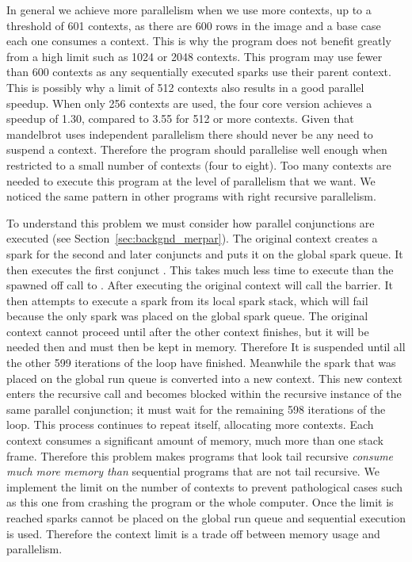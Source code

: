 In general we achieve more parallelism when we use more contexts,
up to a threshold of 601 contexts,
as there are 600 rows in the image and a base case each one consumes a
context.
This is why the program does not benefit greatly from a high limit such as
1024 or 2048 contexts.
This program may use fewer than 600 contexts as any sequentially executed
sparks use their parent context.
This is possibly why a limit of 512 contexts also results in a good parallel
speedup.
When only 256 contexts are used,
the four core version achieves a speedup of 1.30,
compared to 3.55 for 512 or more contexts.
Given that mandelbrot uses independent parallelism there should never be any
need to suspend a context.
Therefore the program should parallelise well enough when restricted to
a small number of contexts (four to eight).
Too many contexts are needed to execute this program at the level of
parallelism that we want.
We noticed the same pattern in other programs with right recursive
parallelism.

\label{context_limit}
To understand this problem we must consider how parallel conjunctions are
executed (see Section~\ref{sec:backgnd_merpar}).
The original context creates a spark for the second and later conjuncts and
puts it on the global spark queue.
It then executes the first conjunct .
This takes much less time to execute than the spawned off call to
.
After executing  the original context will call the
\joinandcontinue barrier.
It then attempts to execute a spark from its local spark stack,
which will fail because the only spark was placed on the global spark queue.
The original context cannot proceed until after the other context finishes,
but it will be needed then and must then be kept in memory.
Therefore It is suspended until all the other 599 iterations of the loop
have finished.
Meanwhile the spark that was placed on the global run queue is converted
into a new context.
This new context enters the recursive call and
becomes blocked within the recursive instance of the same parallel
conjunction;
it must wait for the remaining 598 iterations of the loop.
This process continues to repeat itself,
allocating more contexts.
Each context consumes a significant amount of memory,
much more than one stack frame.
Therefore
this problem makes programs that look tail recursive
\emph{consume much more memory than}
sequential programs that are not tail recursive.
We implement the limit on the number of contexts to prevent pathological
cases such as this one from crashing the program or the whole computer.
Once the limit is reached sparks cannot be placed on the global run queue
and sequential execution is used.
Therefore the context limit is a trade off between memory usage and
parallelism.

